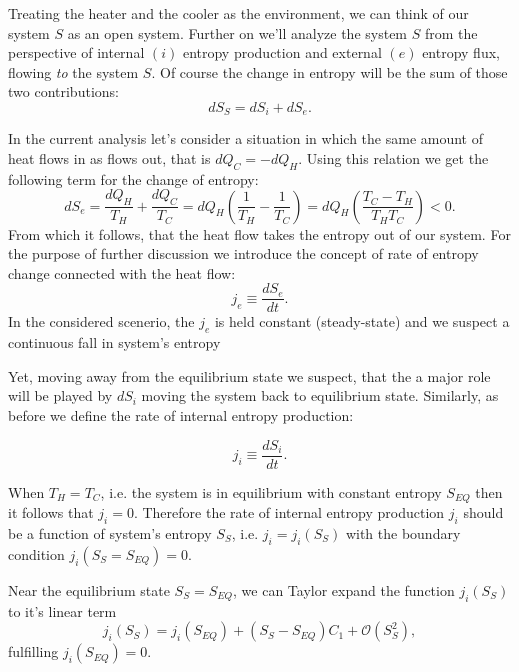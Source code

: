\documentclass[a4paper,12pt,nofootinbib]{article}
\begin{document}
Treating the heater and the cooler as the environment, we can think of our system $S$ as an open system.
Further on we'll analyze the system $S$ from the perspective of internal $(i)$ entropy production
and external $(e)$ entropy flux, flowing \emph{to} the system $S$. 
Of course the change in entropy will be the sum of those two contributions:
\begin{equation}
dS_S=dS_i+dS_e.
\label{entrosum}
\end{equation}

In the current analysis let's consider a situation in which the same amount of heat flows in as flows out, that is $dQ_C=-dQ_H$. Using this relation we get the following term for the change of entropy:
\begin{equation}
dS_e=\frac{dQ_H}{T_H}+\frac{dQ_C}{T_C}=dQ_H\left(\frac{1}{T_H}-\frac{1}{T_C}\right)
=dQ_H\left(\frac{T_C-T_H}{T_HT_C}\right)<0.
\label{dSe1}
\end{equation}
From which it follows, that the heat flow takes the entropy out of our system.
For the purpose of further discussion we introduce the concept of rate of entropy change connected with the heat flow:
\begin{equation}
j_e \equiv  \frac{dS_e}{dt}. 
\end{equation}
In the considered scenerio, the $j_e$ is held constant (steady-state) and we suspect a continuous fall in system's entropy

Yet, moving away from the equilibrium state we suspect, that the a major role will be played by $dS_i$ moving the system back to equilibrium state. Similarly, as before we define the rate of internal entropy production:

\begin{equation}
j_i \equiv \frac{dS_i}{dt}.   
\end{equation} 

When $T_H=T_C$, i.e. the system is in equilibrium with constant entropy $S_{EQ}$ then it follows that $j_i=0$.
Therefore the rate of internal entropy production $j_i$ should be a function  of system's entropy $S_S$, i.e. $j_i = j_i(S_S)$ with the boundary condition $j_i(S_S=S_{EQ})=0$. 

Near the equilibrium state $S_S=S_{EQ}$, we can Taylor expand the function $j_i(S_S)$ to it's linear term
\begin{equation}
j_i(S_S)=j_i\left(S_{EQ}\right)+\left(S_S-S_{EQ}\right)C_1+\mathcal{O}\left(S_S^2\right),
\end{equation} 
fulfilling $j_i\left(S_{EQ}\right)=0$. 
\end{document}
